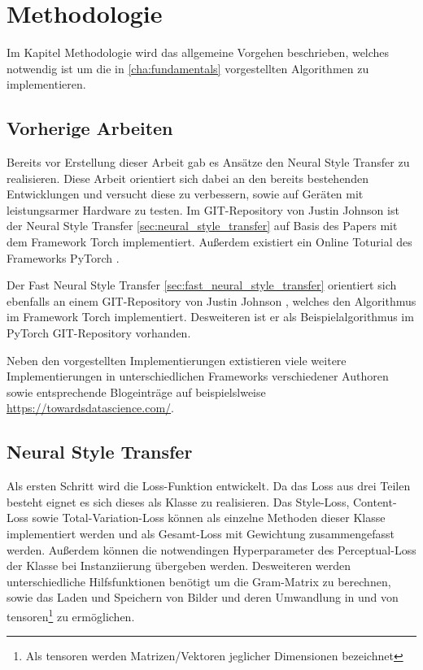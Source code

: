 \chapter{Methodologie}
\label{cha:methodology}

Im Kapitel Methodologie wird das allgemeine Vorgehen beschrieben, welches notwendig ist um die in \ref{cha:fundamentals} vorgestellten Algorithmen zu implementieren.

\section{Vorherige Arbeiten}

Bereits vor Erstellung dieser Arbeit gab es Ansätze den Neural Style Transfer zu realisieren. Diese Arbeit orientiert sich dabei an den bereits bestehenden Entwicklungen und versucht diese zu verbessern, sowie auf Geräten mit leistungsarmer Hardware zu testen. Im GIT-Repository von Justin Johnson \cite{Johnson2015} ist der Neural Style Transfer \ref{sec:neural_style_transfer} auf Basis des Papers \cite{DBLP:journals/corr/GatysEB15a} mit dem Framework Torch \cite{torch} implementiert. Außerdem existiert ein Online Toturial des Frameworks PyTorch \cite{OnlineToturialNeuralStylePyTorch}.

Der Fast Neural Style Transfer \ref{sec:fast_neural_style_transfer} orientiert sich ebenfalls an einem GIT-Repository von Justin Johnson \cite{Johnson2016}, welches den Algorithmus im Framework Torch implementiert. Desweiteren ist er als Beispielalgorithmus im PyTorch GIT-Repository \cite{PyTorchFastNeuralStyle} vorhanden.

Neben den vorgestellten Implementierungen extistieren viele weitere Implementierungen in unterschiedlichen Frameworks verschiedener Authoren sowie entsprechende Blogeinträge auf beispielslweise \url{https://towardsdatascience.com/}.

\pagebreak

\section{Neural Style Transfer}
\label{sec:method_neural_style_transfer}

Als ersten Schritt wird die Loss-Funktion entwickelt. Da das Loss aus drei Teilen besteht eignet es sich dieses als Klasse zu realisieren. Das Style-Loss, Content-Loss sowie Total-Variation-Loss können als einzelne Methoden dieser Klasse implementiert werden und als Gesamt-Loss mit Gewichtung zusammengefasst werden. Außerdem können die notwendingen Hyperparameter des Perceptual-Loss der Klasse bei Instanziierung übergeben werden. Desweiteren werden unterschiedliche Hilfsfunktionen benötigt um die Gram-Matrix zu berechnen, sowie das Laden und Speichern von Bilder und deren Umwandlung in und von \gls{tensor}en\footnote{Als \gls{tensor}en werden Matrizen/Vektoren jeglicher Dimensionen bezeichnet} zu ermöglichen.

